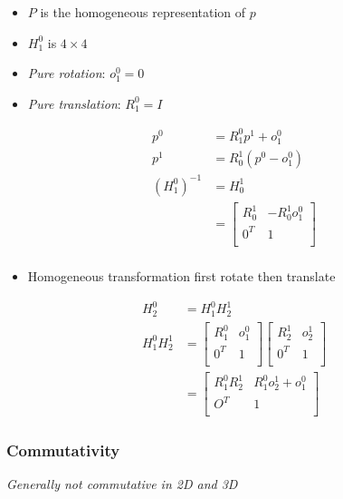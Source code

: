     \begin{itemize}
      \item $ P $ is the homogeneous representation of $ p $
      \item $ H^{0}_{1} $ is $ 4 \times 4 $
      \item \emph{Pure rotation}: $o^{0}_{1} = 0 $
      \item \emph{Pure translation}: $ R^{0}_{1} = I $
    \end{itemize}

    \begin{align}
      p^{0} &= R^{0}_{1} p^{1} + o^{0}_{1} \\
      p^{1} &= R^{1}_{0} \left( p^{0} - o^{0}_{1} \right) \\
      \left( H^{0}_{1} \right)^{-1}
        &= H^{1}_{0} \\
        &=
        \begin{bmatrix}
          R^{1}_{0} & -R^{1}_{0} o^{0}_{1} \\
          0^{T} & 1 \\
        \end{bmatrix} \\
    \end{align}

    \begin{itemize}
      \item Homogeneous transformation first rotate then translate
    \end{itemize}

    \begin{align}
      H^{0}_{2} &= H^{0}_{1} H^{1}_{2} \\
      H^{0}_{1} H^{1}_{2}
        &=
        \begin{bmatrix}
          R^{0}_{1} & o^{0}_{1} \\
          0^{T} & 1 \\
        \end{bmatrix}
        \begin{bmatrix}
          R^{1}_{2} & o^{1}_{2} \\
          0^{T} & 1 \\
        \end{bmatrix} \\
        &=
        \begin{bmatrix}
          R^{0}_{1} R^{1}_{2} & R^{0}_{1} o^{1}_{2} + o^{0}_{1} \\
          O^{T} & 1 \\
        \end{bmatrix}
    \end{align}

    \subsubsection{Commutativity}

      \emph{Generally not commutative in 2D and 3D}

